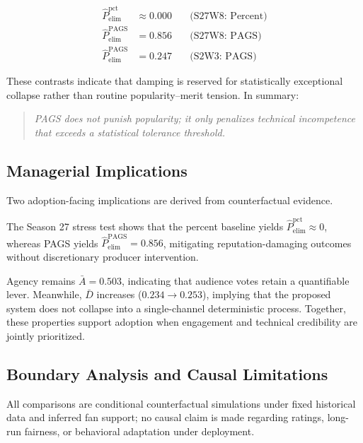 \begin{equation}
\begin{aligned}
\widehat P_{\mathrm{elim}}^{\mathrm{pct}} &\approx 0.000 \quad &\text{(S27W8: Percent)}\\
\widehat P_{\mathrm{elim}}^{\mathrm{PAGS}} &= 0.856 \quad &\text{(S27W8: PAGS)}\\
\widehat P_{\mathrm{elim}}^{\mathrm{PAGS}} &= 0.247 \quad &\text{(S2W3: PAGS)}
\end{aligned}
\label{eq:q4_stress_probs}
\end{equation}

These contrasts indicate that damping is reserved for statistically exceptional collapse rather than routine popularity--merit tension. In summary:

\begin{quote}
\emph{PAGS does not punish popularity; it only penalizes technical incompetence that exceeds a statistical tolerance threshold.}
\end{quote}


\subsection{Managerial Implications}
\label{sec:q4_mgmt}

Two adoption-facing implications are derived from counterfactual evidence.

The Season 27 stress test shows that the percent baseline yields $\widehat P_{\mathrm{elim}}^{\mathrm{pct}}\approx 0$, whereas PAGS yields $\widehat P_{\mathrm{elim}}^{\mathrm{PAGS}}=0.856$, mitigating reputation-damaging outcomes without discretionary producer intervention.

Agency remains $\bar A=0.503$, indicating that audience votes retain a quantifiable lever. Meanwhile, $\bar D$ increases ($0.234\rightarrow 0.253$), implying that the proposed system does not collapse into a single-channel deterministic process. Together, these properties support adoption when engagement and technical credibility are jointly prioritized.


\subsection{Boundary Analysis and Causal Limitations }
\label{sec:q4_limits}

All comparisons are conditional counterfactual simulations under fixed historical data and inferred fan support; no causal claim is made regarding ratings, long-run fairness, or behavioral adaptation under deployment.


